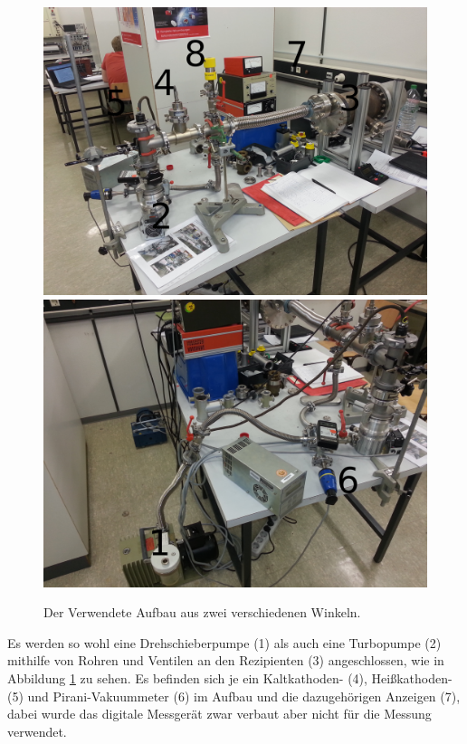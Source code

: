\begin{figure}[h!]
\centering
\includegraphics[scale=0.06]{../Grafiken/Aufbau_.jpg}
\includegraphics[scale=0.06]{../Grafiken/Drehschieber_.jpg}
\caption{Der Verwendete Aufbau aus zwei verschiedenen Winkeln.\label{fig:Aufbau}}
\end{figure}
Es werden so wohl eine Drehschieberpumpe (1) als auch eine Turbopumpe (2) mithilfe von Rohren und Ventilen an den Rezipienten (3) angeschlossen, wie in Abbildung \ref{fig:Aufbau} zu sehen.
Es befinden sich je ein Kaltkathoden- (4), Heißkathoden- (5) und Pirani-Vakuummeter (6) im Aufbau und die dazugehörigen Anzeigen (7), dabei wurde das digitale Messgerät zwar verbaut aber nicht für die Messung verwendet.
